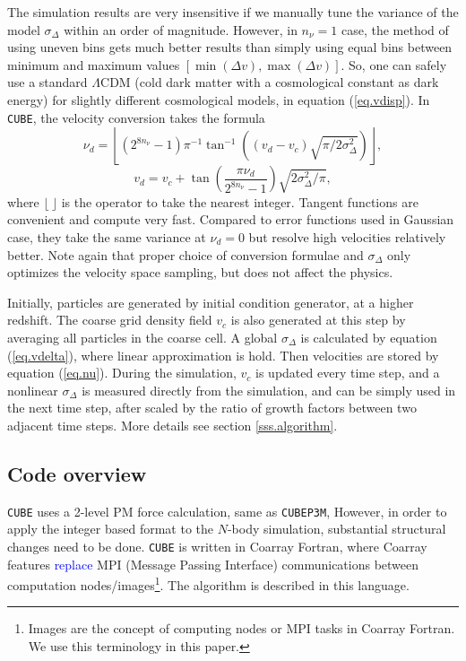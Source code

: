 \documentclass[10pt,twocolumn,preprint]{emulateapj}
\newcommand{\tcb}{\textcolor{blue}}
\begin{document}
The simulation results are very insensitive if we manually tune the variance of the model $\sigma_\Delta$ within an order of magnitude. However, in $n_\nu=1$ case, the method of using uneven bins gets much better results than simply using equal bins between minimum and maximum values $[\min(\Delta v),\max(\Delta v)]$. So, one can safely use a standard $\Lambda$CDM (cold dark matter with a cosmological constant as dark energy) for slightly different cosmological models, in equation (\ref{eq.vdisp}). In {\tt CUBE}, the velocity conversion takes the formula
\begin{equation}\label{eq.nu}
	\nu_d=\left\lfloor(2^{8n_\nu}-1)\pi^{-1}\tan^{-1}\left((v_d-v_c)\sqrt{\pi/2\sigma_\Delta^2}\right)\right\rfloor,
\end{equation}
\begin{equation}\label{eq.v}
	v_d=v_c+\tan\left(\frac{\pi\nu_d}{2^{8n_\nu}-1}\right)\sqrt{2\sigma_\Delta^2/\pi},
\end{equation}
where $\lfloor\ \rfloor$ is the operator to take the nearest integer. Tangent functions are convenient and compute very fast. Compared to error functions used in Gaussian case, they take the same variance at $\nu_d=0$ but resolve high velocities relatively better. Note again that proper choice of conversion formulae and $\sigma_\Delta$ only optimizes the velocity space sampling, but does not affect the physics. 

Initially, particles are generated by initial condition generator, at a higher redshift. The coarse grid density field $v_c$ is also generated at this step by averaging all particles in the coarse cell. A global $\sigma_\Delta$ is calculated by equation (\ref{eq.vdelta}), where linear approximation is hold. Then velocities are stored by equation (\ref{eq.nu}). During the simulation, $v_c$ is updated every time step, and a nonlinear $\sigma_\Delta$ is measured directly from the simulation, and can be simply used in the next time step, after scaled by the ratio of growth factors between two adjacent time steps. More details see section \ref{sss.algorithm}.

\subsection{Code overview}\label{ss.overview}
{\tt CUBE} uses a 2-level PM force calculation, same as {\tt CUBEP3M}, However, in order to apply the integer based format to the $N$-body simulation, substantial structural changes need to be done. {\tt CUBE} is written in Coarray Fortran, where Coarray features \tcb{replace} MPI (Message Passing Interface) communications between computation nodes/images\footnote{Images are the concept of computing nodes or MPI tasks in Coarray Fortran. We use this terminology in this paper.}. The algorithm is described in this language. 
\end{document}
